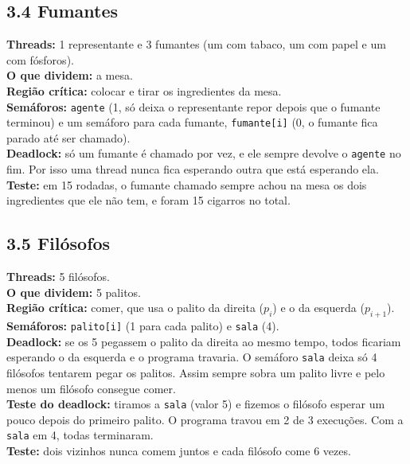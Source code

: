 \documentclass[12pt,a4paper]{article}
\begin{document}
\subsection*{3.4 Fumantes}
\textbf{Threads:} 1 representante e 3 fumantes (um com tabaco, um com papel e um com fósforos).\\
\textbf{O que dividem:} a mesa.\\
\textbf{Região crítica:} colocar e tirar os ingredientes da mesa.\\
\textbf{Semáforos:} \texttt{agente} (1, só deixa o representante repor depois que o fumante terminou) e um
semáforo para cada fumante, \texttt{fumante[i]} (0, o fumante fica parado até ser chamado).\\
\textbf{Deadlock:} só um fumante é chamado por vez, e ele sempre devolve o \texttt{agente} no fim. Por isso uma thread
nunca fica esperando outra que está esperando ela.\\
\textbf{Teste:} em 15 rodadas, o fumante chamado sempre achou na mesa os dois ingredientes que ele não tem, e foram
15 cigarros no total.

\subsection*{3.5 Filósofos}
\textbf{Threads:} 5 filósofos.\\
\textbf{O que dividem:} 5 palitos.\\
\textbf{Região crítica:} comer, que usa o palito da direita ($p_i$) e o da esquerda ($p_{i+1}$).\\
\textbf{Semáforos:} \texttt{palito[i]} (1 para cada palito) e \texttt{sala} (4).\\
\textbf{Deadlock:} se os 5 pegassem o palito da direita ao mesmo tempo, todos ficariam esperando o da esquerda e
o programa travaria. O semáforo \texttt{sala} deixa só 4 filósofos tentarem pegar os palitos. Assim sempre sobra um
palito livre e pelo menos um filósofo consegue comer.\\
\textbf{Teste do deadlock:} tiramos a \texttt{sala} (valor 5) e fizemos o filósofo esperar um pouco depois do primeiro
palito. O programa travou em 2 de 3 execuções. Com a \texttt{sala} em 4, todas terminaram.\\
\textbf{Teste:} dois vizinhos nunca comem juntos e cada filósofo come 6 vezes.
\end{document}
